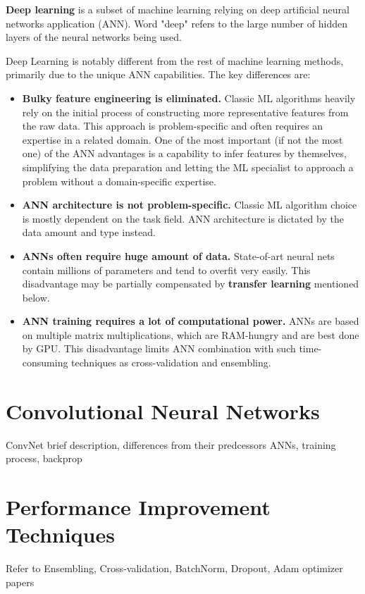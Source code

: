 \documentclass[thesis=B,english]{FITthesis}[2019/12/23]
\begin{document}
\textbf{Deep learning} is a subset of machine learning relying on deep artificial neural networks application (ANN). Word "deep" refers to the large number of hidden layers of the neural networks being used.

Deep Learning is notably different from the rest of machine learning methods, primarily due to the unique ANN capabilities. The key differences are:
\begin{itemize}
	\item \textbf{Bulky feature engineering is eliminated.} Classic ML algorithms heavily rely on the initial process of constructing more representative features from the raw data. This approach is problem-specific and often requires an expertise in a related domain. One of the most important (if not the most one) of the ANN advantages is a capability to infer features by themselves, simplifying the data preparation and letting the ML specialist to approach a problem without a domain-specific expertise.
	\item \textbf{ANN architecture is not problem-specific.} Classic ML algorithm choice is mostly dependent on the task field. ANN architecture is dictated by the data amount and type instead.
	\item \textbf{ANNs often require huge amount of data.} State-of-art neural nets contain millions of parameters and tend to overfit very easily. This disadvantage may be partially compensated by \textbf{transfer learning} mentioned below.
	\item \textbf{ANN training requires a lot of computational power.} ANNs are based on multiple matrix multiplications, which are RAM-hungry and are best done by GPU. This disadvantage limits ANN combination with such time-consuming techniques as cross-validation and ensembling.
\end{itemize} 

\section{Convolutional Neural Networks}

ConvNet brief description, differences from their predcessors ANNs, training process, backprop

\section{Performance Improvement Techniques}

Refer to Ensembling, Cross-validation, BatchNorm, Dropout, Adam optimizer papers
\end{document}
